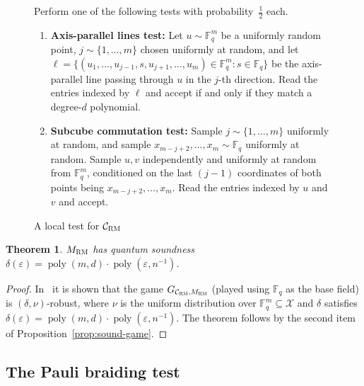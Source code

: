 \documentclass[11pt]{article}
\newtheorem{theorem}{Theorem}[section]
\theoremstyle{definition}
\newcommand{\code}{\mathcal{C}}
\newcommand{\F}{\ensuremath{\mathbb{F}}}
\newcommand{\mX}{\ensuremath{\mathcal{X}}}
\newcommand{\RM}{\ensuremath{\textsc{RM}}}
\DeclareMathOperator{\poly}{poly}
\newcommand{\eps}{\varepsilon}
\newenvironment{gamespec}{
  \begin{mdframed}[style=figstyle]}{
  \end{mdframed}}
\begin{document}
\begin{figure}[!htbp]
  \centering
  \begin{gamespec}
Perform one of the following tests with probability~$\tfrac{1}{2}$ each. 
\begin{enumerate}
	\item \textbf{Axis-parallel lines test:}
		Let $u \sim \F_q^m$ be a uniformly random point, $j\sim \{1,\ldots,m\}$ chosen uniformly at random,
		and let $\ell = \{ (u_1,\ldots,u_{j-1},s,u_{j+1},\ldots,u_m) \in \F_q^m : s \in \F_q \}$
		be the axis-parallel line passing through $u$ in the $j$-th direction. Read the entries indexed by $\ell$ and accept if and only if they match a degree-$d$ polynomial. 
	\item \textbf{Subcube commutation test:}
	Sample $j \sim \{1,\ldots,m\}$ uniformly at random, and sample $x_{m-j+2},\ldots,x_{m} \sim \F_q$ uniformly at random. Sample $u,v$ independently and uniformly at random from $\F_q^m$, conditioned on the last $(j-1)$ coordinates of both points being $x_{m-j+2},\ldots,x_m$. Read the entries indexed by $u$ and $v$ and accept. 	
    \end{enumerate}
  \end{gamespec}
  \caption{A local test for $\code_{\RM}$}
  \label{fig:RM-tester}
\end{figure}



\begin{theorem}\label{thm:mrm-sound}
$M_\RM$ has quantum soundness $\delta(\eps)=\poly(m,d)\cdot \poly(\eps,n^{-1})$.
\end{theorem}

\begin{proof}
In~\cite{ji2022quantum} it is shown that the game $G_{\code_\RM,M_\RM}$ (played using $\F_q$ as the base field) is $(\delta,\nu)$-robust, where $\nu$ is the uniform distribution over $\F_q^m \subseteq \mX$ and $\delta$ satisfies $\delta(\eps)=\poly(m,d)\cdot \poly(\eps,n^{-1})$. The theorem follows by the second item of Proposition~\ref{prop:sound-game}. 
\end{proof}


\subsection{The Pauli braiding test}
\end{document}

